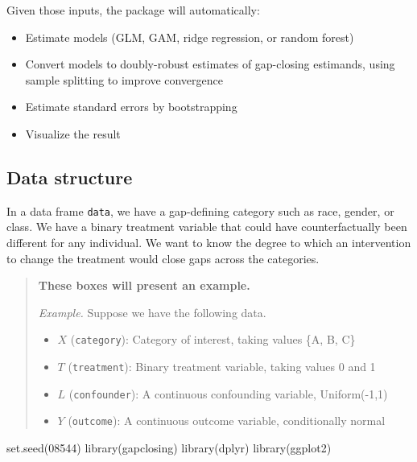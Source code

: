\documentclass[
]{article}
\newenvironment{Shaded}{\begin{snugshade}}{\end{snugshade}}
\newcommand{\DecValTok}[1]{\textcolor[rgb]{0.00,0.00,0.81}{#1}}
\newcommand{\FunctionTok}[1]{\textcolor[rgb]{0.00,0.00,0.00}{#1}}
\newcommand{\NormalTok}[1]{#1}
\providecommand{\tightlist}{%
  \setlength{\itemsep}{0pt}\setlength{\parskip}{0pt}}
\begin{document}
Given those inputs, the package will automatically:

\begin{itemize}
\tightlist
\item
  Estimate models (GLM, GAM, ridge regression, or random forest)
\item
  Convert models to doubly-robust estimates of gap-closing estimands, using sample splitting to improve convergence
\item
  Estimate standard errors by bootstrapping
\item
  Visualize the result
\end{itemize}

\hypertarget{data-structure}{%
\subsection{Data structure}\label{data-structure}}

In a data frame \texttt{data}, we have a gap-defining category such as race, gender, or class. We have a binary treatment variable that could have counterfactually been different for any individual. We want to know the degree to which an intervention to change the treatment would close gaps across the categories.

\begin{quote}
\textbf{These boxes will present an example.}

\emph{Example.} Suppose we have the following data.

\begin{itemize}
\tightlist
\item
  \(X\) (\texttt{category}): Category of interest, taking values \{A, B, C\}
\item
  \(T\) (\texttt{treatment}): Binary treatment variable, taking values 0 and 1
\item
  \(L\) (\texttt{confounder}): A continuous confounding variable, Uniform(-1,1)
\item
  \(Y\) (\texttt{outcome}): A continuous outcome variable, conditionally normal
\end{itemize}
\end{quote}

\begin{Shaded}
\begin{Highlighting}[]
\FunctionTok{set.seed}\NormalTok{(}\DecValTok{08544}\NormalTok{)}
\FunctionTok{library}\NormalTok{(gapclosing)}
\FunctionTok{library}\NormalTok{(dplyr)}
\FunctionTok{library}\NormalTok{(ggplot2)}
\end{Highlighting}
\end{Shaded}
\end{document}
